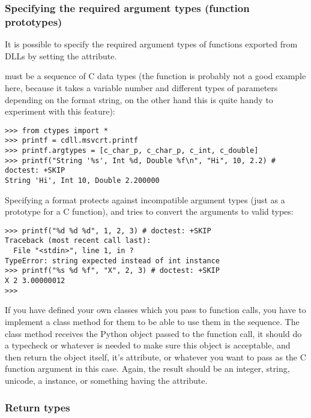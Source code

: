 \subsubsection{Specifying the required argument types (function prototypes)\label{ctypes-specifying-required-argument-types}}

It is possible to specify the required argument types of functions
exported from DLLs by setting the  attribute.

 must be a sequence of C data types (the 
function is probably not a good example here, because it takes a
variable number and different types of parameters depending on the
format string, on the other hand this is quite handy to experiment
with this feature):
\begin{verbatim}
>>> from ctypes import *
>>> printf = cdll.msvcrt.printf
>>> printf.argtypes = [c_char_p, c_char_p, c_int, c_double]
>>> printf("String '%s', Int %d, Double %f\n", "Hi", 10, 2.2) # doctest: +SKIP
String 'Hi', Int 10, Double 2.200000
\end{verbatim}

Specifying a format protects against incompatible argument types (just
as a prototype for a C function), and tries to convert the arguments
to valid types:
\begin{verbatim}
>>> printf("%d %d %d", 1, 2, 3) # doctest: +SKIP
Traceback (most recent call last):
  File "<stdin>", line 1, in ?
TypeError: string expected instead of int instance
>>> printf("%s %d %f", "X", 2, 3) # doctest: +SKIP
X 2 3.00000012
>>>
\end{verbatim}

If you have defined your own classes which you pass to function calls,
you have to implement a  class method for them to be
able to use them in the  sequence. The 
class method receives the Python object passed to the function call,
it should do a typecheck or whatever is needed to make sure this
object is acceptable, and then return the object itself, it's
 attribute, or whatever you want to pass as the C
function argument in this case. Again, the result should be an
integer, string, unicode, a  instance, or something having
the  attribute.


\subsubsection{Return types\label{ctypes-return-types}}

